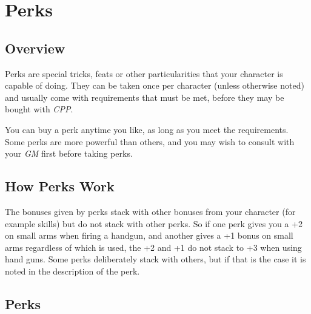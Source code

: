\newcommand{\perk}[2]{\belowpdfbookmark{#1}{#1}\item[#1] (Cost: #2 \emph{CCP})}

\chapter{Perks}
\label{chap:Perks}

\section{Overview}
\label{sec:5-Overview}

Perks are special tricks, feats or other particularities that your character
is capable of doing. They can be taken once per character (unless otherwise
noted) and usually come with requirements that must be met, before they may
be bought with \emph{CPP}.

You can buy a perk anytime you like, as long as you meet the requirements.
Some perks are more powerful than others, and you may wish to consult with
your \emph{GM} first before taking perks.

\section{How Perks Work}
\label{sec:5-How-Perks-Work}

The bonuses given by perks stack with other bonuses from your character
(for example skills) but do not stack with other perks. So if one perk gives
you a +2 on small arms when firing a handgun, and another gives a +1 bonus on
small arms regardless of which is used, the +2 and +1 do not stack to +3 when
using hand guns. Some perks deliberately stack with others, but if that is the
case it is noted in the description of the perk.

\section{Perks}
\label{sec:5-Perks}

